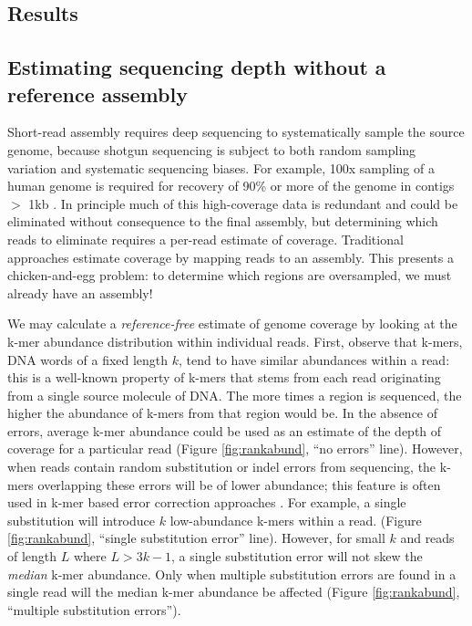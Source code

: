 \documentclass{pnastwo}
\begin{document}
\begin{article}
\section{Results}

\subsection*{Estimating sequencing depth without a reference assembly}

Short-read assembly requires deep sequencing to systematically sample
the source genome, because shotgun sequencing is subject to both
random sampling variation and systematic sequencing biases.  For
example, 100x sampling of a human genome is required for recovery of
90\% or more of the genome in contigs $>$ 1kb \cite{pubmed21187386}.
In principle much of this high-coverage data is redundant and could be
eliminated without consequence to the final assembly, but determining
which reads to eliminate requires a per-read estimate of coverage.
Traditional approaches estimate coverage by mapping reads to an
assembly.  This presents a chicken-and-egg problem: to
determine which regions are oversampled, we must already have an
assembly!

We may calculate a {\em reference-free} estimate of genome coverage by
looking at the k-mer abundance distribution within individual reads.
First, observe that k-mers, DNA words of a fixed length $k$, tend to
have similar abundances within a read: this is a well-known property
of k-mers that stems from each read originating from a single source
molecule of DNA.  The more times a region is sequenced, the higher the
abundance of k-mers from that region would be.  In the absence of
errors, average k-mer abundance could be used as an estimate of the
depth of coverage for a particular read (Figure \ref{fig:rankabund},
``no errors'' line).  However, when reads contain random substitution
or indel errors from sequencing, the k-mers overlapping these errors
will be of lower abundance; this feature is often used in k-mer based
error correction approaches \cite{pubmed21114842}.  For example, a
single substitution will introduce $k$ low-abundance k-mers within a
read.  (Figure \ref{fig:rankabund}, ``single substitution error''
line).  However, for small $k$ and reads of length $L$ where $L >
3k-1$, a single substitution error will not skew the {\em median}
k-mer abundance.  Only when multiple substitution errors are found in
a single read will the median k-mer abundance be affected (Figure
\ref{fig:rankabund}, ``multiple substitution errors'').


\end{article}
\end{document}
